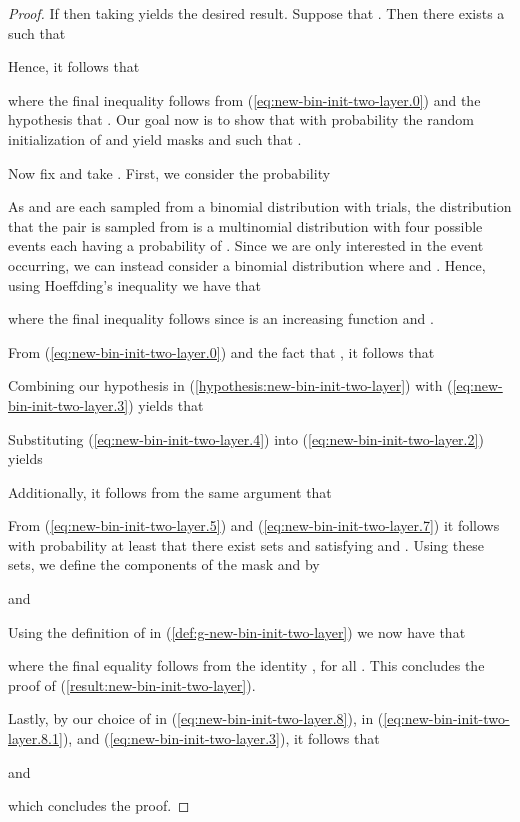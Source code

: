 \documentclass{article} \usepackage{iclr2021_conference,times}
\begin{document}
\begin{proof}
If  then taking  yields the desired result. Suppose that . Then there exists a  such that 

Hence, it follows that

where the final inequality follows from (\ref{eq:new-bin-init-two-layer.0}) and the hypothesis that . Our goal now is to show that with probability  the random initialization of  and  yield masks  and   such that .

Now fix  and take . First, we consider the probability

As  and  are each sampled from a binomial distribution with  trials, the distribution that the pair  is sampled from is a multinomial distribution with four possible events each having a probability of . Since we are only interested in the event  occurring, we can instead consider a binomial distribution where  and . Hence, using Hoeffding's inequality we have that

where the final inequality follows since  is an increasing function and .
\iffalse
First, we consider the probability

As  and  are sampled in the same way and are of the same dimension, the probabilities in the right hand side of (\ref{eq:new-bin-init-two-layer.1}) are the same. Furthermore, as they are sampled from a binomial distribution with  trials, we can bound these probabilities using Hoeffding's inequality. Using Hoeffding's inequality, we find that

\fi
From (\ref{eq:new-bin-init-two-layer.0}) and the fact that , it follows that

Combining our hypothesis in (\ref{hypothesis:new-bin-init-two-layer}) with (\ref{eq:new-bin-init-two-layer.3}) yields that

Substituting (\ref{eq:new-bin-init-two-layer.4}) into (\ref{eq:new-bin-init-two-layer.2}) yields

\iffalse
Combining (\ref{eq:new-bin-init-two-layer.5}) with (\ref{eq:new-bin-init-two-layer.1}) we now have

\fi

Additionally, it follows from the same argument that

From (\ref{eq:new-bin-init-two-layer.5}) and (\ref{eq:new-bin-init-two-layer.7}) it follows with probability at least  that there exist sets  and  satisfying  and . Using these sets, we define the components of the mask  and  by

and

Using the definition of  in (\ref{def:g-new-bin-init-two-layer}) we now have that

where the final equality follows from the identity , for all . This concludes the proof of (\ref{result:new-bin-init-two-layer}).

Lastly, by our choice of  in (\ref{eq:new-bin-init-two-layer.8}),  in (\ref{eq:new-bin-init-two-layer.8.1}), and (\ref{eq:new-bin-init-two-layer.3}), it follows that 

and 

which concludes the proof.
\end{proof}
\end{document}
